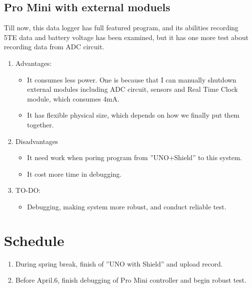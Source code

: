 \documentclass[a4paper,12pt]{article}
\begin{document}
\subsection{Pro Mini with external moduels}
Till now, this data logger has full featured program, and its abilities recording 5TE data and battery voltage has been examined, but it has one more test about recording data from ADC circuit.
\begin{enumerate}
\item Advantages:
\begin{itemize}
\item It consumes less power. One is because that I can manually shutdown external modules including ADC circuit, sensors and Real Time Clock module, which consumes 4mA. 
\item It has flexible physical size, which depends on how we finally put them together.
\end{itemize}
\item Disadvantages
\begin{itemize}
\item It need work when poring program from ''UNO+Shield'' to this system.
\item It cost more time in debugging.
\end{itemize}
\item TO-DO:
\begin{itemize}
\item Debugging, making system more robust, and conduct reliable test.
\end{itemize}
\end{enumerate}
\section{Schedule}
\begin{enumerate}
\item During spring break, finish of ''UNO with Shield'' and upload record.
\item Before April.6, finish debugging of Pro Mini controller and begin robust test.
\end{enumerate}
\end{document}
